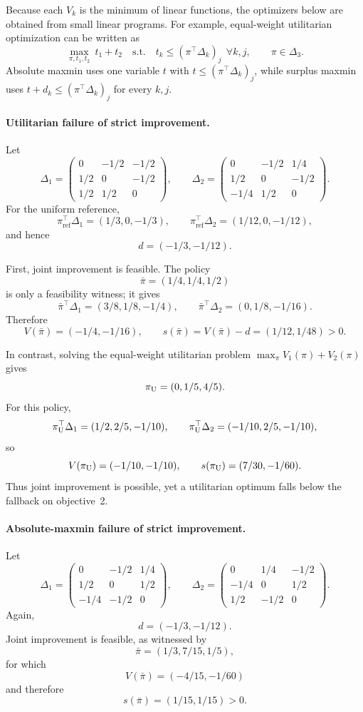 \documentclass{article}
\theoremstyle{remark}
\theoremstyle{plain}
\newcommand{\piref}{\pi_{\mathrm{ref}}}
\begin{document}
Because each $V_k$ is the minimum of linear functions, the optimizers
below are obtained from small linear programs. For example,
equal-weight utilitarian optimization can be written as
\[
\max_{\pi,t_1,t_2}\ t_1+t_2
\quad\text{s.t.}\quad
t_k\le(\pi^\top \Delta_k)_j
\ \ \forall k,j,\qquad
\pi\in\Delta_3.
\]
Absolute maxmin uses one variable $t$ with
$t\le(\pi^\top \Delta_k)_j$, while surplus maxmin uses
$t+d_k\le(\pi^\top \Delta_k)_j$ for every $k,j$.

\paragraph{Utilitarian failure of strict improvement.}
Let
\[
\Delta_1=
\begin{pmatrix}
0&-1/2&-1/2\\
1/2&0&-1/2\\
1/2&1/2&0
\end{pmatrix},
\qquad
\Delta_2=
\begin{pmatrix}
0&-1/2&1/4\\
1/2&0&-1/2\\
-1/4&1/2&0
\end{pmatrix}.
\]
For the uniform reference,
\[
\piref^\top \Delta_1=(1/3,0,-1/3),
\qquad
\piref^\top \Delta_2=(1/12,0,-1/12),
\]
and hence
\[
d=(-1/3,-1/12).
\]

First, joint improvement is feasible. The policy
\[
\bar\pi=(1/4,1/4,1/2)
\]
is only a feasibility witness; it gives
\[
\bar\pi^\top \Delta_1=(3/8,1/8,-1/4),
\qquad
\bar\pi^\top \Delta_2=(0,1/8,-1/16).
\]
Therefore
\[
V(\bar\pi)=(-1/4,-1/16),
\qquad
s(\bar\pi)
=
V(\bar\pi)-d
=
(1/12,1/48)>0.
\]

In contrast, solving the equal-weight utilitarian problem
$\max_\pi V_1(\pi)+V_2(\pi)$ gives
\[
\pi_{\rm U}=(0,1/5,4/5).
\]
For this policy,
\[
\pi_{\rm U}^\top \Delta_1=(1/2,2/5,-1/10),
\qquad
\pi_{\rm U}^\top \Delta_2=(-1/10,2/5,-1/10),
\]
so
\[
V(\pi_{\rm U})=(-1/10,-1/10),
\qquad
s(\pi_{\rm U})
=
(7/30,-1/60).
\]
Thus joint improvement is possible, yet a utilitarian optimum falls
below the fallback on objective~2.

\paragraph{Absolute-maxmin failure of strict improvement.}
Let
\[
\Delta_1=
\begin{pmatrix}
0&-1/2&1/4\\
1/2&0&1/2\\
-1/4&-1/2&0
\end{pmatrix},
\qquad
\Delta_2=
\begin{pmatrix}
0&1/4&-1/2\\
-1/4&0&1/2\\
1/2&-1/2&0
\end{pmatrix}.
\]
Again,
\[
d=(-1/3,-1/12).
\]
Joint improvement is feasible, as witnessed by
\[
\bar\pi=(1/3,7/15,1/5),
\]
for which
\[
V(\bar\pi)=(-4/15,-1/60)
\]
and therefore
\[
s(\bar\pi)=(1/15,1/15)>0.
\]
\end{document}
